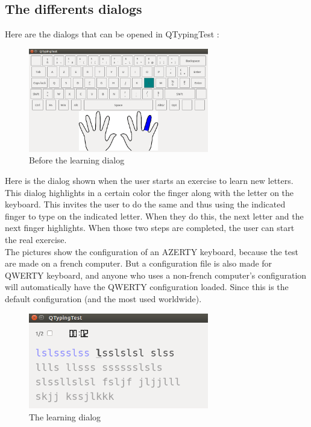 \subsection{The differents dialogs}
Here are the dialogs that can be opened in QTypingTest :

\begin{figure}[H]
	\centering
	\includegraphics[width=0.7\textwidth]{images/dialog-before-learn.png}
	 \caption{Before the learning dialog}
	 \label{dialog-before-learn}
\end{figure}

Here is the dialog shown when the user starts an exercise to learn new letters.\\
This dialog highlights in a certain color the finger along with the letter on the keyboard. This invites the user to do the same and thus using the indicated finger to type on the indicated letter. When they do this, the next letter and the next finger highlights. When those two steps are completed, the user can start the real exercise.\\
The pictures show the configuration of an AZERTY keyboard, because the test are made on a french computer. But a configuration file is also made for QWERTY keyboard, and anyone who uses a non-french computer's configuration will automatically have the QWERTY configuration loaded. Since this is the default configuration (and the most used worldwide).

\begin{figure}[H]
	\centering
	\includegraphics[width=0.7\textwidth]{images/dialog-learn.png}
	 \caption{The learning dialog}
	 \label{dialog-learn}
\end{figure}

